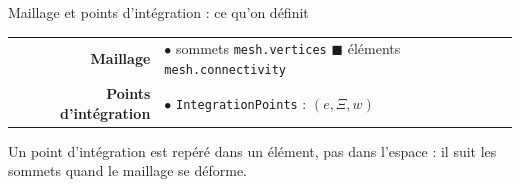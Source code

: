 \documentclass[aspectratio=169,11pt]{beamer}
\begin{document}
\begin{frame}{Maillage et points d'intégration : ce qu'on définit}
  \medskip
  \scriptsize
  \begin{tabular}{@{}r@{\quad}l@{}}
    \textbf{Maillage} &
    \textcolor{pyblue}{$\bullet$} sommets \texttt{mesh.vertices}
    \qquad \textcolor{pyorange}{$\blacksquare$} éléments \texttt{mesh.connectivity} \\
    \textbf{Points d'intégration} &
    \textcolor{pygreen}{$\bullet$} \texttt{IntegrationPoints} : $(e, \Xi, w)$ \\
  \end{tabular}
 
  \smallskip
  \small Un point d'intégration est repéré \alert{dans un élément}, pas dans l'espace :
  il suit les sommets quand le maillage se déforme.
\end{frame}
 
\end{document}
